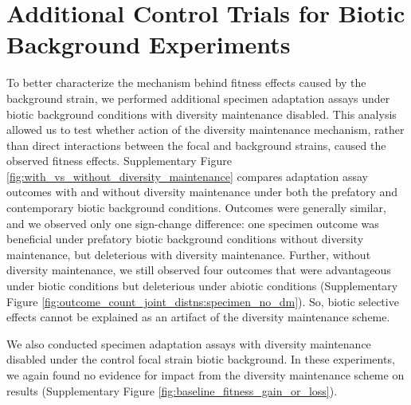 \section{Additional Control Trials for Biotic Background Experiments}

To better characterize the mechanism behind fitness effects caused by the background strain, we performed additional specimen adaptation assays under biotic background conditions with diversity maintenance disabled.
This analysis allowed us to test whether action of the diversity maintenance mechanism, rather than direct interactions between the focal and background strains, caused the observed fitness effects.
Supplementary Figure \ref{fig:with_vs_without_diversity_maintenance} compares adaptation assay outcomes with and without diversity maintenance under both the prefatory and contemporary biotic background conditions.
Outcomes were generally similar, and we observed only one sign-change difference: one specimen outcome was beneficial under prefatory biotic background conditions without diversity maintenance, but deleterious with diversity maintenance.
Further, without diversity maintenance, we still observed four outcomes that were advantageous under biotic conditions but deleterious under abiotic conditions (Supplementary Figure \ref{fig:outcome_count_joint_distns:specimen_no_dm}).
So, biotic selective effects cannot be explained as an artifact of the diversity maintenance scheme.

We also conducted specimen adaptation assays with diversity maintenance disabled under the control focal strain biotic background.
In these experiments, we again found no evidence for impact from the diversity maintenance scheme on results
(Supplementary Figure \ref{fig:baseline_fitness_gain_or_loss}).
